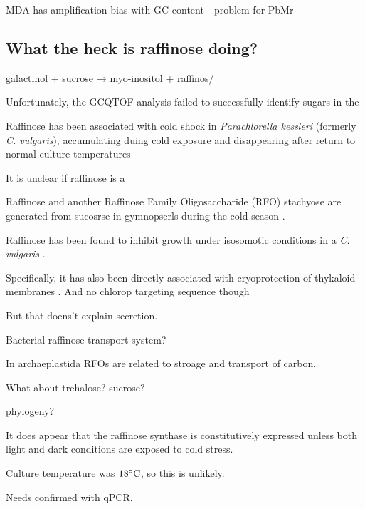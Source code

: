 MDA has amplification bias with GC content - problem for PbMr \citep{Macaulay2014}

\subsection{What the heck is raffinose doing?}

galactinol + sucrose → myo-inositol + raffinos/



Unfortunately, the GCQTOF analysis failed to successfully
identify sugars in the 


Raffinose has been associated with cold shock in
\textit{Parachlorella kessleri} (formerly \textit{C. vulgaris}),
accumulating duing cold exposure and disappearing after return
to normal culture temperatures 

It is unclear if raffinose is a 
\citep{Salerno1989}


Raffinose and another Raffinose Family Oligosaccharide (RFO) 
stachyose are generated from sucosrse in gymnopserls during
the cold season \citep{Kandler1982}.

Raffinose has been found to inhibit growth under
isosomotic conditions in a \textit{C. vulgaris} 
\citep{Setter1979}.

Specifically, it has also been directly associated
with cryoprotection of thykaloid membranes \citep{Lineberger1980}.
And no chlorop targeting sequence though

But that doens't explain secretion.



Bacterial raffinose transport system?


In archaeplastida RFOs are related to stroage
and transport of carbon.  



What about trehalose?
sucrose?




phylogeny?





It does appear that the raffinose synthase is constitutively
expressed unless both light and dark conditions are exposed to cold stress.

Culture temperature was \(18\celsius\), so this is unlikely. 

Needs confirmed with qPCR. 








